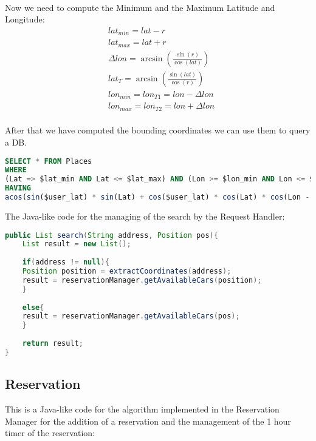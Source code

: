 \\
\noindent Now we need to compute the Minimum and the Maximum Latitude and Longitude:
\begin{eqnarray}
&lat_{min} = lat - r  \\
&lat_{max} = lat + r  \\
&\Delta lon = \arcsin(\frac{\sin(r)}{\cos(lat)})\\
&lat_T = \arcsin(  \frac{\sin(lat)} {\cos(r) }  )\\
&lon_{min} = lon_{T1} = lon - \Delta lon  \\
&lon_{max} = lon_{T2} = lon + \Delta lon 
\end{eqnarray}
\\
\noindent After that we have computed the bounding coordinates we can use them to query a DB.\\
\begin{lstlisting}[language=SQL]
SELECT * FROM Places 
WHERE 
(Lat => $lat_min AND Lat <= $lat_max) AND (Lon >= $lon_min AND Lon <= $lon_max )
HAVING
acos(sin($user_lat) * sin(Lat) + cos($user_lat) * cos(Lat) * cos(Lon - ($user_lon))) <= r;
\end{lstlisting}



\noindent The Java-like code for the managing of the search by the Request Handler:
\begin{lstlisting}[language=Java]
public List search(String address, Position pos){
	List result = new List();
	
	if(address != null){
	Position position = extractCoordinates(address);
	result = reservationManager.getAvailableCars(position); 
	}
	
	else{
	result = reservationManager.getAvailableCars(pos);
	}
	
	return result;
}
\end{lstlisting}

\newpage

\subsection{Reservation}
This is a Java-like code for the algorithm implemented in the Reservation Manager for the addition of a reservation and the management of the 1 hour timer of the reservation:


